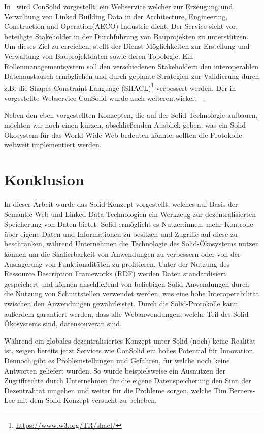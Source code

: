 \documentclass[acmtog]{acmart}
\begin{document}
In~\cite{8633673} wird ConSolid vorgestellt, ein Webservice welcher zur Erzeugung und Verwaltung von Linked Building Data in der Architecture, Engineering, Construction and Operation(AECO)-Industrie dient. Der Service sieht vor, beteiligte Stakeholder in der Durchführung von Bauprojekten zu unterstützen. Um dieses Ziel zu erreichen, stellt der Dienst Möglichkeiten zur Erstellung und Verwaltung von Bauprojektdaten sowie deren Topologie. Ein Rollenmanagementsystem soll den verschiedenen Stakeholdern den interoperablen Datenaustausch ermöglichen und durch geplante Strategien zur Validierung durch z.B. die Shapes Constraint Language (SHACL)\footnote{\url{https://www.w3.org/TR/shacl/}} verbessert werden. Der in ~\cite{8633673} vorgestellte Webservice ConSolid wurde auch weiterentwickelt ~\cite{werbrouck2022consolid}.

Neben den eben vorgestellten Konzepten, die auf der Solid-Technologie aufbauen, möchten wir noch einen kurzen, abschließenden Ausblick geben, was ein Solid-Ökosystem für das World Wide Web bedeuten könnte, sollten die Protokolle weltweit implementiert werden. 

\section{Konklusion} \label{section:konklusion}
In dieser Arbeit wurde das Solid-Konzept vorgestellt, welches auf Basis der Semantic Web und Linked Data Technologien ein Werkzeug zur dezentralisierten Speicherung von Daten bietet. Solid ermöglicht es Nutzer:innen, mehr Kontrolle über eigene Daten und Informationen zu besitzen und Zugriffe auf diese zu beschränken, während Unternehmen die Technologie des Solid-Ökosystems nutzen können um die Skalierbarkeit von Anwendungen zu verbessern oder von der Auslagerung von Funktionalitäten zu profitieren.  Unter der Nutzung des Ressource Description Frameworks (RDF) werden Daten standardisiert gespeichert und können anschließend von beliebigen Solid-Anwendungen durch die Nutzung von Schnittstellen verwendet werden, was eine hohe Interoperabilität zwischen den Anwendungen gewährleistet. Durch die Solid-Protokolle kann außerdem garantiert werden, dass alle Webanwendungen, welche Teil des Solid-Ökosystems sind, datensouverän sind.

Während ein globales dezentralisiertes Konzept unter Solid (noch) keine Realität ist, zeigen bereits jetzt Services wie ConSolid ein hohes Potential für Innovation. Dennoch gibt es Problemstellungen und Gefahren, für welche noch keine Antworten geliefert wurden. So würde beispielsweise ein Ausnutzen der Zugriffrechte durch Unternehmen für die eigene Datenspeicherung den Sinn der Dezentralität umgehen und weiter für die Probleme sorgen, welche Tim Berners-Lee mit dem Solid-Konzept versucht zu beheben. 
\end{document}
